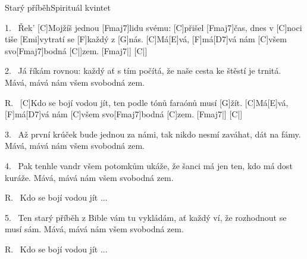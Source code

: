 \begin{song}{Starý příběh}{Spirituál kvintet}

\begin{xverse}{1.~}
Řek' [\large C]Mojžíš jednou [\large Fmaj7]lidu svému: [\large C]přišel [\large Fmaj7]{}čas,
dnes v [\large C]noci tiše [\large Emi]vytratí se [\large F]každý z [\large G]nás.
[\large C]Má[\large E]vá, [\large F]má[\large D7]vá nám [\large C]všem svo[\large Fmaj7]bodná [\large C|]{zem.} [\large Fmaj7|]{} [\large C|]{}
\end{xverse}


\begin{xverse}{2.~}
Já říkám rovnou: každý ať s tím počítá,
že naše cesta ke štěstí je trnitá.
Mává, mává nám všem svobodná zem.
\end{xverse}


\begin{xverse}{R.~}
[\large C]Kdo se bojí vodou jít,
ten podle tónů faraónů musí [\large G]{}žít.
[\large C]Má[\large E]vá, [\large F]má[\large D7]vá nám [\large C]všem svo[\large Fmaj7]bodná [\large C]{zem.} [\large Fmaj7|]{} [\large C|]{}
\end{xverse}


\begin{xverse}{3.~}
Až první krúček bude jednou za námi,
tak nikdo nesmí zaváhat, dát na fámy.
Mává, mává nám všem svobodná zem.
\end{xverse}


\begin{xverse}{4.~}
Pak tenhle vandr všem potomkům ukáže,
že šanci má jen ten, kdo má dost kuráže.
Mává, mává nám všem svobodná zem.
\end{xverse}


\begin{xverse}{R.~}
Kdo se bojí vodou jít ...
\end{xverse}


\begin{xverse}{5.~}
Ten starý příběh z Bible vám tu vykládám,
ať každý ví, že rozhodnout se musí sám.
Mává, mává nám všem svobodná zem.
\end{xverse}


\begin{xverse}{R.~}
Kdo se bojí vodou jít ...
\end{xverse}

\end{song}

